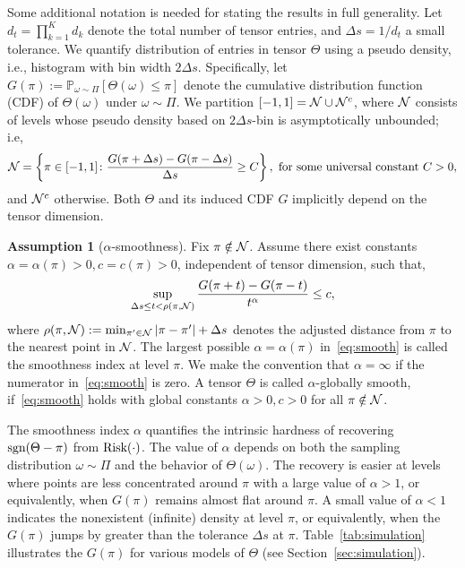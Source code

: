 \documentclass{article}
\theoremstyle{plain}
\theoremstyle{definition}
\newtheorem{assumption}{Assumption}
\def\sign{\textup{sgn}}
\def\risk{\textup{Risk}}
\begin{document}
Some additional notation is needed for stating the results in full generality. Let $d_t=\prod^K_{k=1} d_k$ denote the total number of tensor entries, and $\Delta s = 1/d_t$ a small tolerance. We quantify distribution of entries in tensor $\Theta$ using a pseudo density, i.e., histogram with bin width $2\Delta s$. Specifically, let $G(\pi):=\mathbb{P}_{\omega\sim \Pi}[\Theta(\omega)\leq \pi]$ denote the cumulative distribution function (CDF) of $\Theta(\omega)$ under $\omega\sim \Pi$. We partition $[-1,1]=\mathcal{N} \cup \mathcal{N}^c$, where $\mathcal{N}$ consists of levels whose pseudo density based on $2\Delta s$-bin is asymptotically unbounded; i.e,
\[
\mathcal{N}=\left\{\pi\in[-1,1] \colon {G(\pi+{\Delta s})-G(\pi-{\Delta s})\over \Delta s} \geq C \right\},\ \text{for some universal constant }C>0,
\]
and $\mathcal{N}^c$ otherwise. 
Both $\Theta$ and its induced CDF $G$ implicitly depend on the tensor dimension. 

\begin{assumption}[$\alpha$-smoothness]\label{ass:margin} Fix $\pi \notin \mathcal{N}$. Assume there exist constants $\alpha=\alpha(\pi)> 0, c=c(\pi) >0$, independent of tensor dimension, such that, 
\begin{equation}\label{eq:smooth}
\sup_{\Delta s \leq t<\rho(\pi, \mathcal{N})}{G(\pi+{t})-G(\pi-{t})\over t^\alpha} \leq c,
\end{equation}
where $\rho(\pi,\mathcal{N}):=\min_{\pi'\in \mathcal{N}}|\pi-\pi'|+\Delta s$ denotes the adjusted distance from $\pi$ to the nearest point in $\mathcal{N}$. The largest possible $\alpha=\alpha(\pi)$ in~\eqref{eq:smooth} is called the smoothness index at level $\pi$. We make the convention that $\alpha=\infty$ if the numerator in~\eqref{eq:smooth} is zero.
A tensor $\Theta$ is called $\alpha$-globally smooth, if~\eqref{eq:smooth} holds with global constants $\alpha>0, c>0$ for all $\pi\notin\mathcal{N}$. 
\end{assumption}

The smoothness index $\alpha$ quantifies the intrinsic hardness of recovering $\sign(\Theta-\pi)$ from $\risk(\cdot)$. 
The value of $\alpha$ depends on both the sampling distribution $\omega\sim \Pi$ and the behavior of $\Theta(\omega)$. 
The recovery is easier at levels where points are less concentrated around $\pi$ with a large value of $\alpha>1$, or equivalently, when $G(\pi)$ remains almost  flat around $\pi$. A small value of $\alpha<1$ indicates the nonexistent (infinite) density at level $\pi$, or equivalently, when the $G(\pi)$ jumps by greater than the tolerance $\Delta s$ at $\pi$. Table~\ref{tab:simulation} illustrates the $G(\pi)$ for various models of $\Theta$ (see Section~\ref{sec:simulation}). 
\end{document}
